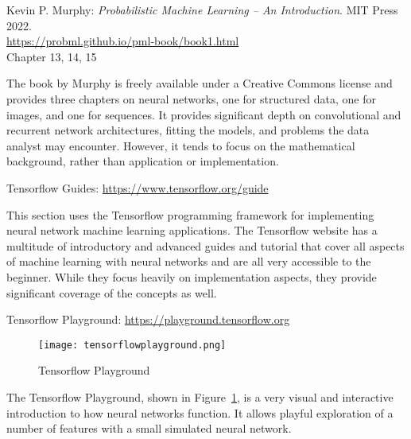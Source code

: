 \begin{resourcebox}
Kevin P. Murphy: \emph{Probabilistic Machine Learning -- An Introduction}. MIT Press 2022. \\

\small\url{https://probml.github.io/pml-book/book1.html}\normalsize \\

Chapter 13, 14, 15
\end{resourcebox}

The book by Murphy is freely available under a Creative Commons license and provides three chapters on neural networks, one for structured data, one for images, and one for sequences. It provides significant depth on convolutional and recurrent network architectures, fitting the models, and problems the data analyst may encounter. However, it tends to focus on the mathematical background, rather than application or implementation.

\begin{resourcebox}
\vspace{0.5\baselineskip} 
Tensorflow Guides: \small\url{https://www.tensorflow.org/guide}\normalsize
\vspace{0.5\baselineskip} 
\end{resourcebox}

This section uses the Tensorflow programming framework for implementing neural network machine learning applications. The Tensorflow website has a multitude of introductory and advanced guides and tutorial that cover all aspects of machine learning with neural networks and are all very accessible to the beginner. While they focus heavily on implementation aspects, they provide significant coverage of the concepts as well.

\begin{resourcebox}
\vspace{0.5\baselineskip} 
Tensorflow Playground: \small\url{https://playground.tensorflow.org}\normalsize
\vspace{0.5\baselineskip} 
\end{resourcebox}

\begin{figure}
\centering
\texttt{[image: tensorflowplayground.png]}
\caption{Tensorflow Playground}
\label{fig:tensorflowplayground}
\end{figure}

The Tensorflow Playground, shown in Figure~\ref{fig:tensorflowplayground}, is a very visual and interactive introduction to how neural networks function. It allows playful exploration of a number of features with a small simulated neural network.

